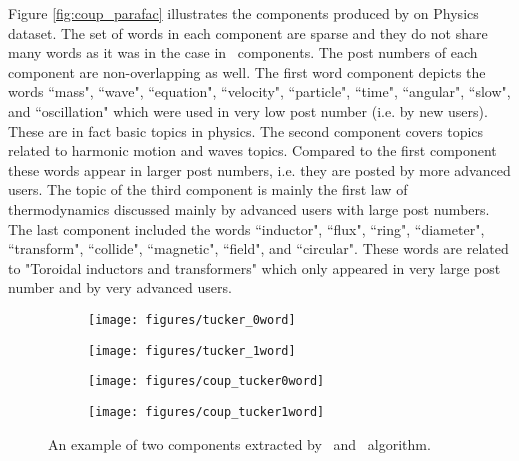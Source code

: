 Figure \ref{fig:coup_parafac} illustrates the components produced by \ourAlgo  on Physics dataset. The set of words in each component are sparse and they do not share many words  as it was in the case
in \paraNS\ components. The post numbers of each component are non-overlapping as well. The first word
component depicts the words ``mass", ``wave", ``equation", ``velocity",  ``particle", ``time", 
``angular", ``slow",  and ``oscillation"  which were used in very low post number (i.e. by
new users). These are in fact basic topics in physics. The second component  covers topics related to
harmonic motion and waves topics. Compared to the first component these words appear in larger post
numbers, i.e. they are posted by more advanced users. The topic of the third component is mainly
the first law of thermodynamics discussed mainly by advanced users with large post numbers. The last
component included the words ``inductor", ``flux", ``ring", ``diameter", ``transform", ``collide",
``magnetic", ``field", and ``circular". These words are related to "Toroidal inductors and transformers"
which only appeared in very large post number and by very advanced users.

\begin{figure}
\begin{center}
 \begin{subfigure}[b]{0.23\textwidth}
                \texttt{[image: figures/tucker\_0word]}
                \caption{\tuckerNS}
                \label{fig:tucker_0word}
        \end{subfigure}%
        \begin{subfigure}[b]{0.23\textwidth}
                \texttt{[image: figures/tucker\_1word]}
                \caption{\tuckerNS}
                \label{fig:tucker_1word}
        \end{subfigure}%
        
\begin{subfigure}[b]{0.23\textwidth}
                \texttt{[image: figures/coup\_tucker0word]}
                \caption{\ourAlgo}
                \label{fig:coup_tucker_0word}
        \end{subfigure}%
        \begin{subfigure}[b]{0.23\textwidth}
                \texttt{[image: figures/coup\_tucker1word]}
                \caption{\ourAlgo}
                \label{fig:coup_tucker_1word}
        \end{subfigure}%
 \caption{\label{fig:res_tucker}An example of two components extracted by \tuckerNS\ and  \ourAlgo\ algorithm. }
 \end{center}
\end{figure}


